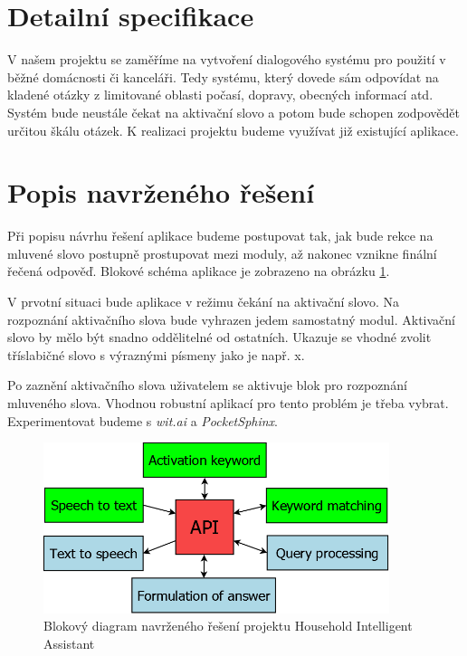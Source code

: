 \documentclass[12pt,a4paper]{article}
\begin{document}
\section*{Detailní specifikace}
V našem projektu se zaměříme na vytvoření dialogového systému pro použití v běžné domácnosti či kanceláři. Tedy systému, který dovede sám odpovídat na kladené otázky z limitované oblasti počasí, dopravy, obecných informací atd. Systém bude neustále čekat na aktivační slovo a potom bude schopen zodpovědět určitou škálu otázek. K realizaci projektu budeme využívat již existující aplikace. 

\section*{Popis navrženého řešení}
Při popisu návrhu řešení aplikace budeme postupovat tak, jak bude rekce na mluvené slovo postupně prostupovat mezi moduly, až nakonec vznikne finální řečená odpověď. Blokové schéma aplikace je zobrazeno na obrázku \ref{fig:diagram api}.

V prvotní situaci bude aplikace v režimu čekání na aktivační slovo. Na rozpoznání aktivačního slova bude vyhrazen jedem samostatný modul. Aktivační slovo by mělo být snadno oddělitelné od ostatních. Ukazuje se vhodné zvolit tříslabičné slovo s výraznými písmeny jako je např. x.

Po zaznění aktivačního slova uživatelem se aktivuje blok pro rozpoznání mluveného slova. Vhodnou robustní aplikací pro tento problém je třeba vybrat. Experimentovat budeme s \textit{wit.ai} a \textit{PocketSphinx}.

\begin{figure}[ht!]
	\begin{center}
	\includegraphics[width = 0.9\textwidth]{Diagram_API.png}
	\caption{Blokový diagram navrženého řešení projektu Household Intelligent Assistant}
	\label{fig:diagram api}
	\end{center}
\end{figure}
\end{document}
